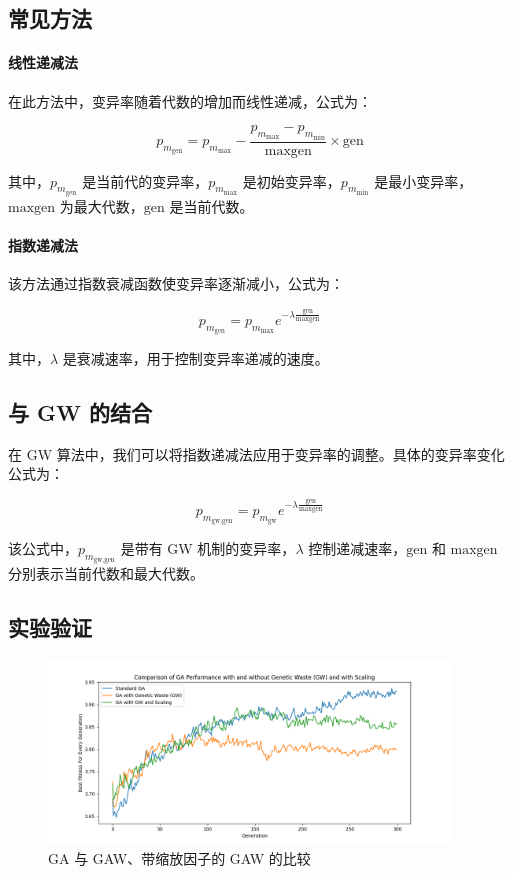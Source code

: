 \documentclass[journal=gmj]{report}%
\theoremstyle{definition}
\numberwithin{equation}{section}
\begin{document}
\subsection{常见方法}

\paragraph{线性递减法}

在此方法中，变异率随着代数的增加而线性递减，公式为：

$$
p_{m_{\text{gen}}} = p_{m_{\text{max}}} - \frac{p_{m_{\text{max}}} - p_{m_{\text{min}}}}{\text{maxgen}} \times \text{gen}
$$

其中，$p_{m_{\text{gen}}}$ 是当前代的变异率，$p_{m_{\text{max}}}$ 是初始变异率，$p_{m_{\text{min}}}$ 是最小变异率，$\text{maxgen}$ 为最大代数，$\text{gen}$ 是当前代数。

\paragraph{指数递减法}

该方法通过指数衰减函数使变异率逐渐减小，公式为：

$$
p_{m_{\text{gen}}} = p_{m_{\text{max}}} e^{-\lambda \frac{\text{gen}}{\text{maxgen}}}
$$

其中，$\lambda$ 是衰减速率，用于控制变异率递减的速度。

\subsection{与 GW 的结合}

在 GW 算法中，我们可以将指数递减法应用于变异率的调整。具体的变异率变化公式为：

$$
p_{m_{\text{gw},\text{gen}}} = p_{m_{\text{gw}}} e^{-\lambda \frac{\text{gen}}{\text{maxgen}}}
$$

该公式中，$p_{m_{\text{gw},\text{gen}}}$ 是带有 GW 机制的变异率，$\lambda$ 控制递减速率，$\text{gen}$ 和 $\text{maxgen}$ 分别表示当前代数和最大代数。

\subsection{实验验证}

\begin{figure}[H]
  \centering
  \includegraphics[width=0.95\textwidth]{../assets/img/comparison_gw_vs_standard_vs_gwscaling.png}
  \caption{GA 与 GAW、带缩放因子的 GAW 的比较}\label{fig:}
\end{figure}
\end{document}
